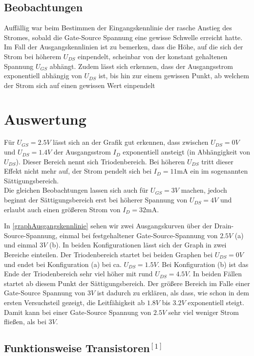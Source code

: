 \documentclass[11pt, a4paper]{article}
\begin{document}
\subsection*{Beobachtungen}
Auffällig war beim Bestimmen der Eingangskennlinie der rasche Anstieg des Stromes, sobald die Gate-Source Spannung eine gewisse Schwelle erreicht hatte.
Im Fall der Ausgangskennlinien ist zu bemerken, dass die Höhe, auf die sich der Strom bei höherem $U_{DS}$ einpendelt, scheinbar von der konstant gehaltenen Spannung $U_{GS}$ abhängt. Zudem lässt sich erkennen, dass der Ausgangsstrom exponentiell abhängig von $U_{DS}$ ist, bis hin zur einem gewissen Punkt, ab welchem der Strom sich auf einen gewissen Wert einpendelt

\section*{Auswertung}
Für $U_{GS} = 2.5 V$ lässt sich an der Grafik gut erkennen, dass zwischen $U_{DS} = 0 V$ und $U_{DS} = 1.4 V$ der Ausgangsstrom $I_D$ exponentiell ansteigt (in Abhängigkeit von $U_{DS}$). Dieser Bereich nennt sich Triodenbereich. Bei höheren $U_{DS}$ tritt dieser Effekt nicht mehr auf, der Strom pendelt sich bei $I_D = 11\si{\milli\ampere}$ ein im sogenannten Sättigungsbereich. \\
Die gleichen Beobachtungen lassen sich auch für $U_{GS} = 3 V$ machen, jedoch beginnt der Sättigungsbereich erst bei höherer Spannung von $U_{DS} = 4 V$ und erlaubt auch einen größeren Strom von $I_D = 32\si{\milli\ampere}$.

In \autoref{graphAusgangskennlinie} sehen wir zwei Ausgangskurven über der Drain-Source-Spannung, einmal bei festgehaltener Gate-Source-Spannung von $2.5V$ (a) und einmal $3V$ (b). In beiden Konfigurationen lässt sich der Graph in zwei Bereiche einteilen. Der Triodenbereich startet bei beiden Graphen bei $U_{DS} = 0 V$ und endet bei Konfiguration (a) bei ca. $U_{DS} = 1.5 V$. Bei Konfiguration (b) ist das Ende der Triodenbereich sehr viel höher mit rund $U_{DS} = 4.5 V$. In beiden Fällen startet ab diesem Punkt der Sättigungsbereich. Der größere Bereich im Falle einer Gate-Source Spannung von $3 V$ ist dadurch zu erklären, als dass, wie schon in dem ersten Versuchsteil gezeigt, die Leitfähigkeit ab $1.8 V$ bis $3.2 V$ exponentiell steigt. Damit kann bei einer Gate-Source Spannung von $2.5 V$ sehr viel weniger Strom fließen, als bei $3 V$.

\subsection*{Funktionsweise Transistoren$^{[1]}$}
\label{transistoren_info}
\end{document}
